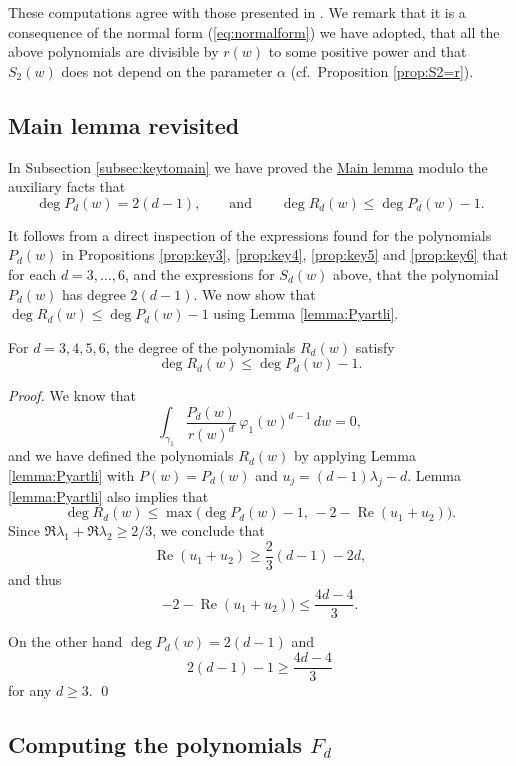 \begin{remark}
 These computations agree with those presented in \cite{Pyartli2006}. We remark that it is a consequence of the normal form (\ref{eq:normalform}) we have adopted, that all the above polynomials are divisible by $r(w)$ to some positive power and that $S_2(w)$ does not depend on the parameter $\alpha$ (cf.~Proposition \ref{prop:S2=r}).
\end{remark}


\subsection{Main lemma revisited}\label{subsec:mainlemmarevisited}

In Subsection \ref{subsec:keytomain} we have proved the \hyperref[lemma:main]{Main lemma} modulo the auxiliary facts that
\[ \deg{P_d(w)}=2(d-1), \qquad \mbox{and} \qquad \deg{R_d(w)}\leq\deg{P_d(w)}-1. \] 

It follows from a direct inspection of the expressions found for the polynomials $P_d(w)$ in Propositions \ref{prop:key3}, \ref{prop:key4}, \ref{prop:key5} and \ref{prop:key6} that for each $d=3,\ldots,6$, and the expressions for $S_d(w)$ above, that the polynomial $P_d(w)$ has degree $2(d-1)$. We now show that $\deg{R_d(w)}\leq\deg{P_d(w)}-1$ using Lemma \ref{lemma:Pyartli}.

\begin{proposition}\label{prop:degRd} 
 For $d=3,4,5,6$, the degree of the polynomials $R_d(w)$ satisfy 
\[ \deg{R_d(w)}\leq\deg{P_d(w)}-1. \]
\end{proposition}

\begin{proof}
We know that
\[ \int_{\gamma_1}\frac{P_d(w)}{r(w)^d}\,\varphi_1(w)^{d-1}\,dw = 0, \]
and we have defined the polynomials $R_d(w)$ by applying Lemma \ref{lemma:Pyartli} with $P(w)=P_d(w)$ and $u_j=(d-1)\lambda_j-d$. Lemma \ref{lemma:Pyartli} also implies that
\[ \deg{R_d}(w)\leq \max{\big(\deg{P_d}(w)-1,\,-2-\operatorname{Re}{(u_1+u_2)}\big)}. \]
Since $\Re\lambda_1+\Re\lambda_2\geq 2/3$, we conclude that 
\[ \operatorname{Re}(u_1+u_2)\geq\frac{2}{3}(d-1)-2d, \]
and thus 
\[ -2-\operatorname{Re}{(u_1+u_2)}\big)\leq\frac{4d-4}{3}. \]

On the other hand $\deg{P_d(w)}=2(d-1)$ and 
\[ 2(d-1)-1\geq\frac{4d-4}{3} \]
for any $d\geq3$.
\qed\end{proof}


\subsection{Computing the polynomials \texorpdfstring{$F_d$}{Fd}}\label{subsec:computingFd}

